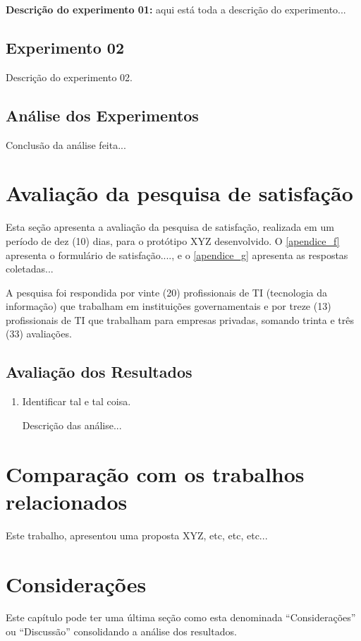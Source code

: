 \noindent \textbf{Descrição do experimento 01:} aqui está toda a descrição do experimento...



\subsection{Experimento 02}
\label{ss_c5_CT02}

Descrição do experimento 02.




\subsection{Análise dos Experimentos}
\label{ss_c5_analise-experimentos}

Conclusão da análise feita...



\section{Avaliação da pesquisa de satisfação}
\label{s_c5_pesquisa}

Esta seção apresenta a avaliação da pesquisa de satisfação, realizada em um período de dez (10) dias, para o protótipo XYZ desenvolvido. O \autoref{apendice_f} apresenta o formulário de satisfação...., e o \autoref{apendice_g} apresenta as respostas coletadas...

A pesquisa foi respondida por vinte (20) profissionais de TI (tecnologia da informação) que trabalham em instituições governamentais e por treze (13) profissionais de TI que trabalham para empresas privadas, somando trinta e três (33) avaliações. 

\subsection{Avaliação dos Resultados}
\label{ss_c5_avaliacao-pesquisa}


\begin{enumerate}
    \item Identificar tal e tal coisa.
    
    Descrição das análise...
\end{enumerate}
    
    
\section{Comparação com os trabalhos relacionados}
\label{s_c5_trab-relacionados}

Este trabalho, apresentou uma proposta XYZ, etc, etc, etc...


\section{Considerações}
\label{s_c5_consideracoes}

Este capítulo pode ter uma última seção como esta denominada ``Considerações'' ou ``Discussão'' consolidando a análise dos resultados.